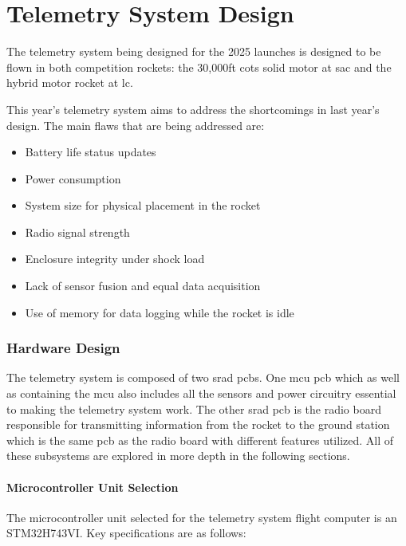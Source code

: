 \part{Telemetry System Design}

The telemetry system being designed for the 2025 launches is designed to be flown in both competition rockets: the
30,000ft \gls{cots} solid motor at \gls{sac} and the hybrid motor rocket at \gls{lc}.

This year's telemetry system aims to address the shortcomings in last year's design. The main flaws that are being
addressed are:

\begin{itemize}
    \item Battery life status updates
    \item Power consumption
    \item System size for physical placement in the rocket
    \item Radio signal strength
    \item Enclosure integrity under shock load
    \item Lack of sensor fusion and equal data acquisition
    \item Use of memory for data logging while the rocket is idle
\end{itemize}

\section{Hardware Design}

The telemetry system is composed of two \gls{srad} \gls{pcb}s. One \gls{mcu} \gls{pcb} which as well as containing the
\gls{mcu} also includes all the sensors and power circuitry essential to making the telemetry system work. The other
\gls{srad} \gls{pcb} is the radio board responsible for transmitting information from the rocket to the ground station
which is the same \gls{pcb} as the radio board with different features utilized. All of these subsystems are explored
in more depth in the following sections.

\subsection{Microcontroller Unit Selection}

The microcontroller unit selected for the telemetry system flight computer is an STM32H743VI. Key specifications are as
follows:

